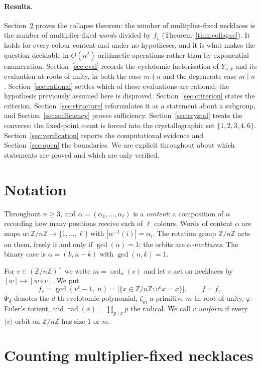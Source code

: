 \documentclass[11pt,a4paper]{article}
\theoremstyle{plain}
\theoremstyle{definition}
\theoremstyle{remark}
\newcommand{\Z}{\mathbb{Z}}
\newcommand{\Zn}{\Z/n\Z}
\newcommand{\units}[1]{(\Z/#1\Z)^{\times}}
\newcommand{\rad}{\operatorname{rad}}
\newcommand{\ord}{\operatorname{ord}}
\begin{document}
\paragraph{Results.}
Section~\ref{sec:count} proves the collapse theorem: the number of multiplier-fixed
necklaces is the number of multiplier-fixed \emph{words} divided by $f_1$
(Theorem~\ref{thm:collapse}). It holds for every colour content and under no hypotheses,
and it is what makes the question decidable in $O(n^2)$ arithmetic operations rather than by
exponential enumeration. Section~\ref{sec:eval} records the cyclotomic factorisation of
$Y_{n,k}$ and its evaluation at roots of unity, in both the case $m\nmid n$ and the
degenerate case $m\mid n$. Section~\ref{sec:rational} settles which of these evaluations are
rational; the hypothesis previously assumed here is disproved.
Section~\ref{sec:criterion} states the criterion, Section~\ref{sec:structure} reformulates
it as a statement about a subgroup, and Section~\ref{sec:sufficiency} proves sufficiency.
Section~\ref{sec:crystal} treats the converse: the fixed-point count is forced into the
crystallographic set $\{1,2,3,4,6\}$. Section~\ref{sec:verification} reports the
computational evidence and Section~\ref{sec:open} the boundaries. We are explicit
throughout about which statements are proved and which are only verified.

\section{Notation}\label{sec:prelim}

Throughout $n\ge 3$, and $\alpha=(\alpha_1,\dots,\alpha_\ell)$ is a \emph{content}: a
composition of $n$ recording how many positions receive each of $\ell$ colours. Words of
content $\alpha$ are maps $w:\Zn\to\{1,\dots,\ell\}$ with $|w^{-1}(i)|=\alpha_i$. The rotation
group $\Zn$ acts on them, freely if and only if $\gcd(\alpha)=1$; the orbits are
\emph{$\alpha$-necklaces}. The binary case is $\alpha=(k,n-k)$ with $\gcd(n,k)=1$.

For $v\in\units{n}$ we write $m=\ord_n(v)$ and let $v$ act on necklaces by
$[w]\mapsto[w\circ v]$. We put
\[
  f_e=\gcd(v^e-1,\;n)=\bigl|\{x\in\Zn: v^e x=x\}\bigr|,\qquad f=f_1 .
\]
$\Phi_d$ denotes the $d$-th cyclotomic polynomial, $\zeta_m$ a primitive $m$-th root of
unity, $\varphi$ Euler's totient, and $\rad(x)=\prod_{p\mid x}p$ the radical. We call $v$
\emph{uniform} if every $\langle v\rangle$-orbit on $\Zn$ has size $1$ or $m$.

\section{Counting multiplier-fixed necklaces}\label{sec:count}
\end{document}

